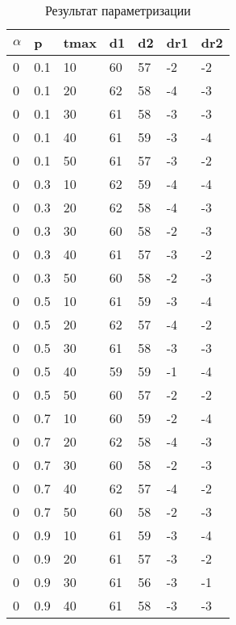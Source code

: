 \chapter{}
	\begin{longtable}{|l|l|l|l|l|l|l|}
		\caption{Результат параметризации}\label{ap:t}\\
		\hline
		$\alpha$ & p   & tmax & d1 & d2 & dr1 & dr2 \\ \hline
		0     & 0.1 & 10   & 60 & 57 & -2  & -2  \\ \hline
		0     & 0.1 & 20   & 62 & 58 & -4  & -3  \\ \hline
		0     & 0.1 & 30   & 61 & 58 & -3  & -3  \\ \hline
		0     & 0.1 & 40   & 61 & 59 & -3  & -4  \\ \hline
		0     & 0.1 & 50   & 61 & 57 & -3  & -2  \\ \hline
		0     & 0.3 & 10   & 62 & 59 & -4  & -4  \\ \hline
		0     & 0.3 & 20   & 62 & 58 & -4  & -3  \\ \hline
		0     & 0.3 & 30   & 60 & 58 & -2  & -3  \\ \hline
		0     & 0.3 & 40   & 61 & 57 & -3  & -2  \\ \hline
		0     & 0.3 & 50   & 60 & 58 & -2  & -3  \\ \hline
		0     & 0.5 & 10   & 61 & 59 & -3  & -4  \\ \hline
		0     & 0.5 & 20   & 62 & 57 & -4  & -2  \\ \hline
		0     & 0.5 & 30   & 61 & 58 & -3  & -3  \\ \hline
		0     & 0.5 & 40   & 59 & 59 & -1  & -4  \\ \hline
		0     & 0.5 & 50   & 60 & 57 & -2  & -2  \\ \hline
		0     & 0.7 & 10   & 60 & 59 & -2  & -4  \\ \hline
		0     & 0.7 & 20   & 62 & 58 & -4  & -3  \\ \hline
		0     & 0.7 & 30   & 60 & 58 & -2  & -3  \\ \hline
		0     & 0.7 & 40   & 62 & 57 & -4  & -2  \\ \hline
		0     & 0.7 & 50   & 60 & 58 & -2  & -3  \\ \hline
		0     & 0.9 & 10   & 61 & 59 & -3  & -4  \\ \hline
		0     & 0.9 & 20   & 61 & 57 & -3  & -2  \\ \hline
		0     & 0.9 & 30   & 61 & 56 & -3  & -1  \\ \hline
		0     & 0.9 & 40   & 61 & 58 & -3  & -3  \\ \hline

\end{longtable}
